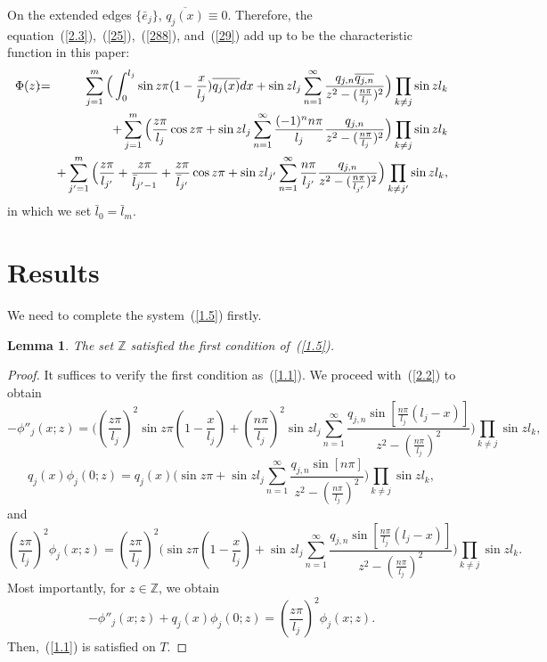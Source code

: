 \documentclass[10pt,a4paper]{article}
\theoremstyle{plain}
\newtheorem{lemma}[theorem]{Lemma}
\theoremstyle{definition}
\theoremstyle{remark}
\numberwithin{equation}{section}
\begin{document}
On the extended edges $\{\bar{e}_{j}\}$, $\overline{q_{j}(x)}\equiv 0$. Therefore, the equation~(\ref{2.3}),~(\ref{25}),~(\ref{288}), and~(\ref{29}) add up to be the characteristic function in this paper:
\begin{eqnarray}\nonumber
\Phi(z)&\hspace{-5pt}:=\hspace{-5pt}&\sum_{j=1}^{m}\Big(\int_{0}^{l_{j}}\sin{z\pi(1-\frac{x}{l_{j}})}\overline{q_{j}(x)}dx+\sin{z l_{j}}\sum_{n=1}^{\infty}\frac{q_{j,n}\overline{q_{j,n}}}{z^{2}-(\frac{n\pi}{l_{j}})^{2}}\Big)\prod_{k\neq j}\sin{z l_{k}}\\&&
+\sum_{j=1}^{m}\Big(\frac{z\pi}{l_{j}}\cos{z\pi}+\sin{z l_{j}}\sum_{n=1}^{\infty}\frac{(-1)^{n}n\pi}{l_{j}}\frac{q_{j,n}}{z^{2}-(\frac{n\pi}{l_{j}})^{2}}\Big)\prod_{k\neq j}\sin{z l_{k}}\nonumber\\
&&+\sum_{j'=1}^{m}\Big(\frac{z\pi}{l_{j'}}+\frac{z\pi}{\bar{l}_{j'-1}}+\frac{z\pi}{\bar{l}_{j'}}\cos{z\pi}+\sin{zl_{j'}}\sum_{n=1}^{\infty}\frac{n\pi}{l_{j'}}\frac{q_{j,n}}{z^{2}-(\frac{n\pi}{l_{j'}})^{2}}\Big)\prod_{k\neq j'}\sin{z l_{k}},\label{Phi}
\end{eqnarray}
in which we set $\bar{l}_{0}=\bar{l}_{m}$.


\section{Results}
We need to complete the system~(\ref{1.5}) firstly.
\begin{lemma}
The set $\mathbb{Z}$ satisfied the first condition of~(\ref{1.5}).
\end{lemma}
\begin{proof}
It suffices to verify the first condition as~(\ref{1.1}). We proceed with~(\ref{2.2}) to obtain
\begin{equation}
-\phi''_{j}(x;z)=\Big((\frac{z\pi}{l_{j}})^{2}\sin{z\pi(1-\frac{x}{l_{j}})}+(\frac{n\pi}{l_{j}})^{2}\sin{z l_{j}}\sum_{n=1}^{\infty}\frac{q_{j,n}\sin[\frac{n\pi}{l_{j}}(l_{j}-x)]}{z^{2}-(\frac{n\pi}{l_{j}})^{2}}\Big)\prod_{k\neq j}\sin{z l_{k}},\label{331}
\end{equation}
\begin{equation}
q_{j}(x)\phi_{j}(0;z)=q_{j}(x)\Big(\sin{z\pi}+\sin{z l_{j}}\sum_{n=1}^{\infty}\frac{q_{j,n}\sin[n\pi]}{z^{2}-(\frac{n\pi}{l_{j}})^{2}}\Big)\prod_{k\neq j}\sin{z l_{k}},\label{332}
\end{equation}
and
\begin{equation}
(\frac{z\pi}{l_{j}})^{2}\phi_{j}(x;z)=(\frac{z\pi}{l_{j}})^{2}\Big(\sin{z\pi(1-\frac{x}{l_{j}})}+\sin{z l_{j}}\sum_{n=1}^{\infty}\frac{q_{j,n}\sin[\frac{n\pi}{l_{j}}(l_{j}-x)]}{z^{2}-(\frac{n\pi}{l_{j}})^{2}}\Big)\prod_{k\neq j}\sin{z l_{k}}.\label{333}
\end{equation}
Most importantly, for $z\in\mathbb{Z}$, we obtain
$$-\phi''_{j}(x;z)+q_{j}(x)\phi_{j}(0;z)=(\frac{z\pi}{l_{j}})^{2}\phi_{j}(x;z).$$
Then,~(\ref{1.1}) is satisfied on $T$. 
\end{proof}%
\end{document}

